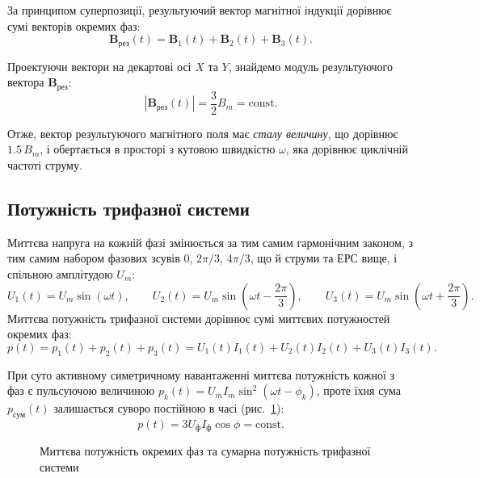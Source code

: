 За принципом суперпозиції, результуючий вектор магнітної індукції дорівнює сумі векторів окремих фаз:
\begin{equation}
	\mathbf{B}_{\text{рез}}(t) = \mathbf{B}_1(t) + \mathbf{B}_2(t) + \mathbf{B}_3(t).
\end{equation}

Проектуючи вектори на декартові осі $X$ та $Y$, знайдемо модуль результуючого вектора $\mathbf{B}_{\text{рез}}$:
\begin{equation}
	|\mathbf{B}_{\text{рез}}(t)| = \frac{3}{2} B_m = \text{const}.
\end{equation}

Отже, вектор результуючого магнітного поля має \emph{сталу величину}, що дорівнює $1.5\,B_m$, і обертається в просторі з кутовою швидкістю $\omega$, яка дорівнює циклічній частоті струму.

\subsection*{Потужність трифазної системи}

Миттєва напруга на кожній фазі змінюється за тим самим гармонічним законом, з тим самим набором фазових зсувів $0$, $2\pi/3$, $4\pi/3$, що й струми та ЕРС вище, і спільною амплітудою $U_m$:
\begin{equation*}
	U_1(t) = U_m \sin(\omega t), \qquad
	U_2(t) = U_m \sin\left(\omega t - \frac{2\pi}{3}\right), \qquad
	U_3(t) = U_m \sin\left(\omega t + \frac{2\pi}{3}\right).
\end{equation*}
Миттєва потужність трифазної системи дорівнює сумі миттєвих потужностей окремих фаз:
\begin{equation}
	p(t) = p_1(t) + p_2(t) + p_3(t) = U_1(t)I_1(t) + U_2(t)I_2(t) + U_3(t)I_3(t).
\end{equation}

При суто активному симетричному навантаженні миттєва потужність кожної з фаз є пульсуючою величиною $p_k(t) = U_m I_m \sin^2(\omega t - \phi_k)$, проте їхня сума $p_{\text{сум}}(t)$ залишається суворо постійною в часі (рис.~\ref{pic:ThreePhasePower}):
\begin{equation}
	p(t) = 3 U_\text{ф} I_\text{ф} \cos\phi = \text{const}.
\end{equation}

\begin{figure}[h!]
	\centering
	\caption{Миттєва потужність окремих фаз та сумарна потужність трифазної системи}
	\label{pic:ThreePhasePower}
\end{figure}

